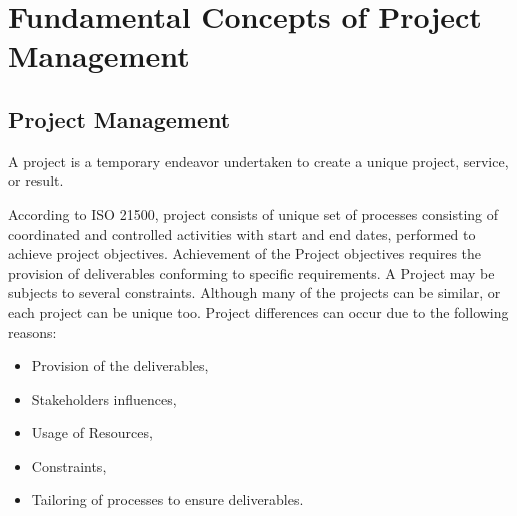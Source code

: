 %
%
\let\textcircled=\pgftextcircled
\chapter{Fundamental Concepts of Project Management}
\label{chap:intro}


 
 \section{Project Management}
 \label{sec:sec001}
 A project is a temporary endeavor undertaken to create a unique project, service, or result\cite{PMI-Website}.

According to ISO 21500, project consists of unique set of processes consisting of coordinated and controlled activities with start and end dates, performed to achieve project objectives. Achievement of the Project objectives requires the provision of deliverables conforming to specific requirements. A Project may be subjects to several constraints. Although many of the projects can be similar, or each project can be unique too. Project differences can occur due to the following reasons:
 \begin{itemize}
     \item Provision of the deliverables,
     \item Stakeholders influences, 
     \item Usage of Resources,
     \item Constraints,
     \item Tailoring of processes to ensure deliverables.
 \end{itemize}
     


